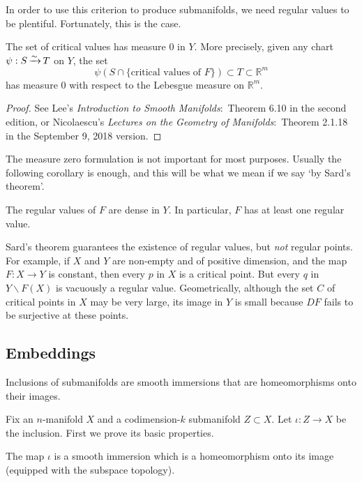 \documentclass[a4paper,11pt]{article}
\begin{document}
	In order to use this criterion to produce submanifolds, we need regular values to be plentiful. Fortunately, this is the case.

	\begin{thm}
		The set of critical values has measure 0 in $Y$. More precisely, given any chart $\psi: S \operatorname{\xrightarrow{\sim}} T$ on $Y$, the set
		\[
			\psi(S \cap \{\text{critical values of }F\}) \subset T \subset \mathbb{R}^m
		\]
		has measure 0 with respect to the Lebesgue measure on $\mathbb{R}^m$.
	\end{thm}
	\begin{proof}
		See Lee's \emph{Introduction to Smooth Manifolds}:\ Theorem 6.10 in the second edition, or Nicolaescu's \emph{Lectures on the Geometry of Manifolds}:\ Theorem 2.1.18 in the September 9, 2018 version.
	\end{proof}

	The measure zero formulation is not important for most purposes. Usually the following corollary is enough, and this will be what we mean if we say `by Sard's theorem'.

	\begin{cor}
		The regular values of $F$ are dense in $Y$. In particular, $F$ has at least one regular value.
	\end{cor}

	\begin{rmk}
		Sard's theorem guarantees the existence of regular values, but \emph{not} regular points. For example, if $X$ and $Y$ are non-empty and of positive dimension, and the map $F: X \to Y$ is constant, then every $p$ in $X$ is a critical point. But every $q$ in $Y \backslash F(X)$ is vacuously a regular value. Geometrically, although the set $C$ of critical points in $X$ may be very large, its image in $Y$ is small because $DF$ fails to be surjective at these points.
	\end{rmk}

	\subsection{Embeddings} 

	Inclusions of submanifolds are smooth immersions that are homeomorphisms onto their images.

	Fix an $n$-manifold $X$ and a codimension-$k$ submanifold $Z \subset X$. Let $\iota : Z \to X$ be the inclusion. First we prove its basic properties.

	\begin{lem}
		The map $\iota$ is a smooth immersion which is a homeomorphism onto its image (equipped with the subspace topology).
		\label{lem:1.91}
	\end{lem}
\end{document}
